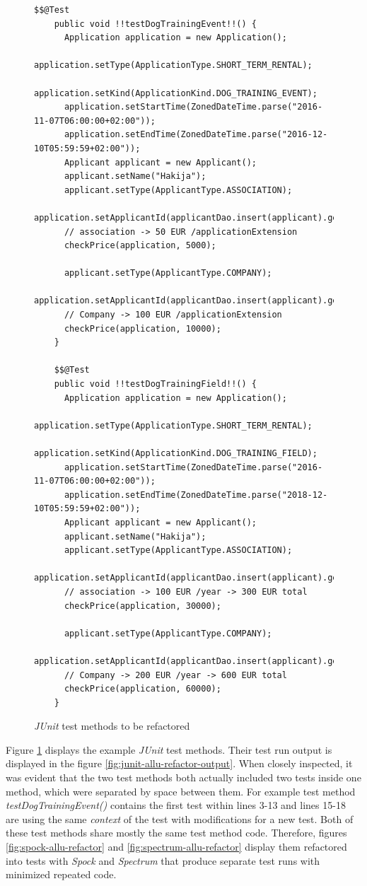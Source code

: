     \begin{figure}[H]
      \begin{lstlisting}[style=java]
    $$@Test
    public void !!testDogTrainingEvent!!() {
      Application application = new Application();
      application.setType(ApplicationType.SHORT_TERM_RENTAL);
      application.setKind(ApplicationKind.DOG_TRAINING_EVENT);
      application.setStartTime(ZonedDateTime.parse("2016-11-07T06:00:00+02:00"));
      application.setEndTime(ZonedDateTime.parse("2016-12-10T05:59:59+02:00"));
      Applicant applicant = new Applicant();
      applicant.setName("Hakija");
      applicant.setType(ApplicantType.ASSOCIATION);
      application.setApplicantId(applicantDao.insert(applicant).getId());
      // association -> 50 EUR /applicationExtension
      checkPrice(application, 5000);

      applicant.setType(ApplicantType.COMPANY);
      application.setApplicantId(applicantDao.insert(applicant).getId());
      // Company -> 100 EUR /applicationExtension
      checkPrice(application, 10000);
    }

    $$@Test
    public void !!testDogTrainingField!!() {
      Application application = new Application();
      application.setType(ApplicationType.SHORT_TERM_RENTAL);
      application.setKind(ApplicationKind.DOG_TRAINING_FIELD);
      application.setStartTime(ZonedDateTime.parse("2016-11-07T06:00:00+02:00"));
      application.setEndTime(ZonedDateTime.parse("2018-12-10T05:59:59+02:00"));
      Applicant applicant = new Applicant();
      applicant.setName("Hakija");
      applicant.setType(ApplicantType.ASSOCIATION);
      application.setApplicantId(applicantDao.insert(applicant).getId());
      // association -> 100 EUR /year -> 300 EUR total
      checkPrice(application, 30000);

      applicant.setType(ApplicantType.COMPANY);
      application.setApplicantId(applicantDao.insert(applicant).getId());
      // Company -> 200 EUR /year -> 600 EUR total
      checkPrice(application, 60000);
    }
        \end{lstlisting}
        \caption{\textit{JUnit} test methods to be refactored}
        \label{fig:junit-allu-refactor}

    \end{figure}

    Figure \ref{fig:junit-allu-refactor} displays the example \textit{JUnit} test methods. Their test run output is displayed in the
    figure \ref{fig:junit-allu-refactor-output}. When closely inspected, it was evident
    that the two test methods both actually included two tests inside one method, which were separated by space between
    them. For example test method \textit{testDogTrainingEvent()} contains the first test within lines 3-13 and lines 15-18 are using
    the same \textit{context} of the test with modifications for a new test.
    Both of these test methods share mostly the same test method code. Therefore, figures \ref{fig:spock-allu-refactor} and
    \ref{fig:spectrum-allu-refactor} display them refactored
    into tests with \textit{Spock} and \textit{Spectrum} that produce separate test runs with minimized repeated code.

